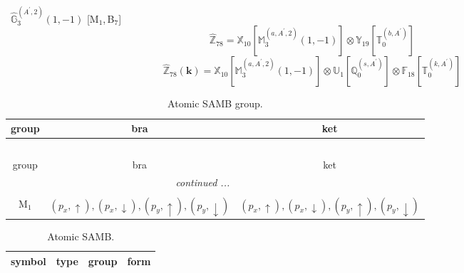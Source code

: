 \documentclass[fleqn,10pt,landscape]{article}
\begin{document}
\begin{itemize}
\begin{dmath*}
\end{dmath*}
\vspace{4mm}
\noindent {} $\,\,\,\hat{\mathbb{G}}_{3}^{(A^{\prime},2)}(1,-1)$ [M$_{1}$,\,B$_{7}$]
\begin{dmath*}
\hat{\mathbb{Z}}_{78}=\mathbb{X}_{10}[\mathbb{M}_{3}^{(a,A^{\prime},2)}(1,-1)] \otimes\mathbb{Y}_{19}[\mathbb{T}_{0}^{(b,A^{\prime})}]
\end{dmath*}
\begin{dmath*}
\hat{\mathbb{Z}}_{78}(\bm{k})=\mathbb{X}_{10}[\mathbb{M}_{3}^{(a,A^{\prime},2)}(1,-1)] \otimes\mathbb{U}_{1}[\mathbb{Q}_{0}^{(s,A^{\prime})}] \otimes\mathbb{F}_{18}[\mathbb{T}_{0}^{(k,A^{\prime})}]
\end{dmath*}
\begin{center}
\renewcommand{\arraystretch}{1.3}
\begin{longtable}{c|c|c}
\caption{Atomic SAMB group.}
 \\
 \hline \hline
group & bra & ket \\ \hline \endfirsthead

\multicolumn{2}{l}{\tablename\ \thetable{}} \\
 \hline \hline
group & bra & ket \\ \hline \endhead

 \hline \hline
\multicolumn{2}{r}{\footnotesize\it continued ...} \\ \endfoot

 \hline \hline
\multicolumn{2}{r}{} \\ \endlastfoot

M$_{1}$ & $(p_{x},\uparrow), (p_{x},\downarrow), (p_{y},\uparrow), (p_{y},\downarrow)$ & $(p_{x},\uparrow), (p_{x},\downarrow), (p_{y},\uparrow), (p_{y},\downarrow)$ \\
\end{longtable}
\end{center}
\begin{center}
\renewcommand{\arraystretch}{1.3}
\begin{longtable}{c|c|c|c}
\caption{Atomic SAMB.}
 \\
 \hline \hline
symbol & type & group & form \\ \hline \endfirsthead


\end{longtable}
\end{center}
\end{itemize}
\end{document}
